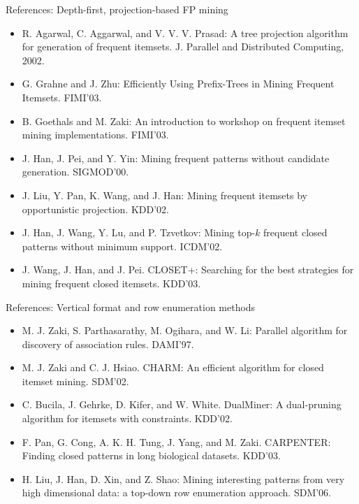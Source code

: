 \documentclass[aspectratio=169,t]{beamer}
\begin{document}
  {
    \begin{frame}{References: Depth-first, projection-based FP mining}
    \begin{itemize}
      \item R. Agarwal, C. Aggarwal, and V. V. V. Prasad: A tree projection algorithm for generation of frequent itemsets. J. Parallel and Distributed Computing, 2002.
      \item G. Grahne and J. Zhu: Efficiently Using Prefix-Trees in Mining Frequent Itemsets. FIMI'03.
      \item B. Goethals and M. Zaki: An introduction to workshop on frequent itemset mining implementations. FIMI'03.
      \item J. Han, J. Pei, and Y. Yin: Mining frequent patterns without candidate generation. SIGMOD'00.
      \item J. Liu, Y. Pan, K. Wang, and J. Han: Mining frequent itemsets by opportunistic projection. KDD'02.
      \item J. Han, J. Wang, Y. Lu, and P. Tzvetkov: Mining top-$k$ frequent closed patterns without minimum support. ICDM'02.
      \item J. Wang, J. Han, and J. Pei.  CLOSET+: Searching for the best strategies for mining frequent closed itemsets. KDD'03.
    \end{itemize}
    \end{frame}
  }

  {
    \begin{frame}{References: Vertical format and row enumeration methods}
    \begin{itemize}
      \item M. J. Zaki, S. Parthasarathy, M. Ogihara, and W. Li: Parallel algorithm for discovery of association rules. DAMI'97.
      \item M. J. Zaki and C. J. Hsiao. CHARM: An efficient algorithm for closed itemset mining. SDM'02.
      \item C. Bucila, J. Gehrke, D. Kifer, and W. White. DualMiner: A dual-pruning algorithm for itemsets with constraints. KDD'02.
      \item F. Pan, G. Cong, A. K. H. Tung, J. Yang, and M. Zaki. CARPENTER: Finding closed patterns in long biological datasets. KDD'03.
      \item H. Liu, J. Han, D. Xin, and Z. Shao: Mining interesting patterns from very high dimensional data: a top-down row enumeration approach. SDM'06.
    \end{itemize}
    \end{frame}
  }
\end{document}
